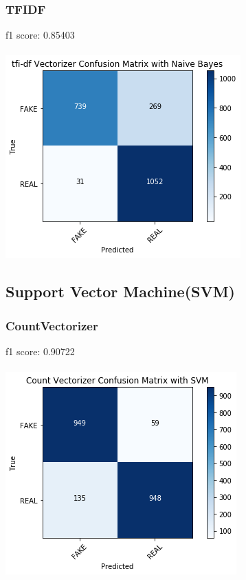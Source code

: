 \documentclass[twoside,twocolumn]{article}
\begin{document}
    \subsubsection{TFIDF}
    f1 score: 0.85403\\
    \\ \noindent \includegraphics[scale=0.6]{figures/NBC_tfidf.png}
    
    \subsection{Support Vector Machine(SVM)}
    \subsubsection{CountVectorizer}
    f1 score: 0.90722\\
    \\ \noindent \includegraphics[scale=0.6]{figures/SVM_count.png}
\end{document}
